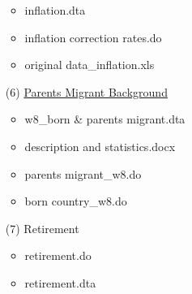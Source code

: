 \documentclass[12pt]{article}
\begin{document}
\begin{itemize}
\begin{itemize}
        \item inflation.dta
        \item inflation correction rates.do
        \item original data\_inflation.xls
    \end{itemize}
    \item[(6)] \href{https://www.share-datadocutool.org/physical-data-products/view/259}{Parents Migrant Background}
    \begin{itemize}
        \item w8\_born \& parents migrant.dta
        \item description and statistics.docx
        \item parents migrant\_w8.do
        \item born country\_w8.do
    \end{itemize}
    \item[(7)] Retirement
    \begin{itemize}
        \item retirement.do
        \item retirement.dta
    \end{itemize}
\end{itemize}
\end{document}
